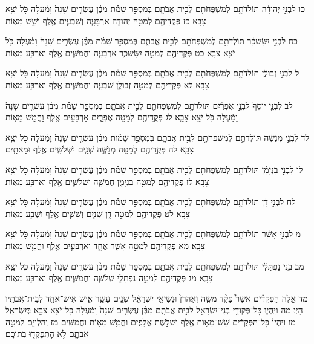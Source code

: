 \documentclass[twoside, openany, parskip=half, 11pt]{book}
\begin{document}
כו לִבְנֵ֣י יְהוּדָ֔ה תּוֹלְדֹתָ֥ם לְמִשְׁפְּחֹתָ֖ם לְבֵ֣ית אֲבֹתָ֑ם בְּמִסְפַּ֣ר שֵׁמֹ֗ת מִבֶּ֨ן עֶשְׂרִ֤ים שָׁנָה֙ וָמַ֔עְלָה כֹּ֖ל יֹצֵ֥א צָבָֽא׃ כז פְּקֻדֵיהֶ֖ם לְמַטֵּ֣ה יְהוּדָ֑ה אַרְבָּעָ֧ה וְשִׁבְעִ֛ים אֶ֖לֶף וְשֵׁ֥שׁ מֵאֽוֹת׃

כח לִבְנֵ֣י יִשָּׂשכָ֔ר תּוֹלְדֹתָ֥ם לְמִשְׁפְּחֹתָ֖ם לְבֵ֣ית אֲבֹתָ֑ם בְּמִסְפַּ֣ר שֵׁמֹ֗ת מִבֶּ֨ן עֶשְׂרִ֤ים שָׁנָה֙ וָמַ֔עְלָה כֹּ֖ל יֹצֵ֥א צָבָֽא׃ כט פְּקֻדֵיהֶ֖ם לְמַטֵּ֣ה יִשָּׂשכָ֑ר אַרְבָּעָ֧ה וַחֲמִשִּׁ֛ים אֶ֖לֶף וְאַרְבַּ֥ע מֵאֽוֹת׃

ל לִבְנֵ֣י זְבוּלֻ֔ן תּוֹלְדֹתָ֥ם לְמִשְׁפְּחֹתָ֖ם לְבֵ֣ית אֲבֹתָ֑ם בְּמִסְפַּ֣ר שֵׁמֹ֗ת מִבֶּ֨ן עֶשְׂרִ֤ים שָׁנָה֙ וָמַ֔עְלָה כֹּ֖ל יֹצֵ֥א צָבָֽא׃ לא פְּקֻדֵיהֶ֖ם לְמַטֵּ֣ה זְבוּלֻ֑ן שִׁבְעָ֧ה וַחֲמִשִּׁ֛ים אֶ֖לֶף וְאַרְבַּ֥ע מֵאֽוֹת׃

לב לִבְנֵ֤י יוֹסֵף֙ לִבְנֵ֣י אֶפְרַ֔יִם תּוֹלְדֹתָ֥ם לְמִשְׁפְּחֹתָ֖ם לְבֵ֣ית אֲבֹתָ֑ם בְּמִסְפַּ֣ר שֵׁמֹ֗ת מִבֶּ֨ן עֶשְׂרִ֤ים שָׁנָה֙ וָמַ֔עְלָה כֹּ֖ל יֹצֵ֥א צָבָֽא׃ לג פְּקֻדֵיהֶ֖ם לְמַטֵּ֣ה אֶפְרָ֑יִם אַרְבָּעִ֥ים אֶ֖לֶף וַחֲמֵ֥שׁ מֵאֽוֹת׃

לד לִבְנֵ֣י מְנַשֶּׁ֔ה תּוֹלְדֹתָ֥ם לְמִשְׁפְּחֹתָ֖ם לְבֵ֣ית אֲבֹתָ֑ם בְּמִסְפַּ֣ר שֵׁמ֗וֹת מִבֶּ֨ן עֶשְׂרִ֤ים שָׁנָה֙ וָמַ֔עְלָה כֹּ֖ל יֹצֵ֥א צָבָֽא׃ לה פְּקֻדֵיהֶ֖ם לְמַטֵּ֣ה מְנַשֶּׁ֑ה שְׁנַ֧יִם וּשְׁלֹשִׁ֛ים אֶ֖לֶף וּמָאתָֽיִם׃

לו לִבְנֵ֣י בִנְיָמִ֔ן תּוֹלְדֹתָ֥ם לְמִשְׁפְּחֹתָ֖ם לְבֵ֣ית אֲבֹתָ֑ם בְּמִסְפַּ֣ר שֵׁמֹ֗ת מִבֶּ֨ן עֶשְׂרִ֤ים שָׁנָה֙ וָמַ֔עְלָה כֹּ֖ל יֹצֵ֥א צָבָֽא׃ לז פְּקֻדֵיהֶ֖ם לְמַטֵּ֣ה בִנְיָמִ֑ן חֲמִשָּׁ֧ה וּשְׁלֹשִׁ֛ים אֶ֖לֶף וְאַרְבַּ֥ע מֵאֽוֹת׃

לח לִבְנֵ֣י דָ֔ן תּוֹלְדֹתָ֥ם לְמִשְׁפְּחֹתָ֖ם לְבֵ֣ית אֲבֹתָ֑ם בְּמִסְפַּ֣ר שֵׁמֹ֗ת מִבֶּ֨ן עֶשְׂרִ֤ים שָׁנָה֙ וָמַ֔עְלָה כֹּ֖ל יֹצֵ֥א צָבָֽא׃ לט פְּקֻדֵיהֶ֖ם לְמַטֵּ֣ה דָ֑ן שְׁנַ֧יִם וְשִׁשִּׁ֛ים אֶ֖לֶף וּשְׁבַ֥ע מֵאֽוֹת׃

מ לִבְנֵ֣י אָשֵׁ֔ר תּוֹלְדֹתָ֥ם לְמִשְׁפְּחֹתָ֖ם לְבֵ֣ית אֲבֹתָ֑ם בְּמִסְפַּ֣ר שֵׁמֹ֗ת מִבֶּ֨ן עֶשְׂרִ֤ים שָׁנָה֙ וָמַ֔עְלָה כֹּ֖ל יֹצֵ֥א צָבָֽא׃ מא פְּקֻדֵיהֶ֖ם לְמַטֵּ֣ה אָשֵׁ֑ר אֶחָ֧ד וְאַרְבָּעִ֛ים אֶ֖לֶף וַחֲמֵ֥שׁ מֵאֽוֹת׃

מב בְּנֵ֣י נַפְתָּלִ֔י תּוֹלְדֹתָ֥ם לְמִשְׁפְּחֹתָ֖ם לְבֵ֣ית אֲבֹתָ֑ם בְּמִסְפַּ֣ר שֵׁמֹ֗ת מִבֶּ֨ן עֶשְׂרִ֤ים שָׁנָה֙ וָמַ֔עְלָה כֹּ֖ל יֹצֵ֥א צָבָֽא׃ מג פְּקֻדֵיהֶ֖ם לְמַטֵּ֣ה נַפְתָּלִ֑י שְׁלֹשָׁ֧ה וַחֲמִשִּׁ֛ים אֶ֖לֶף וְאַרְבַּ֥ע מֵאֽוֹת׃

מד אֵ֣לֶּה הַפְּקֻדִ֡ים אֲשֶׁר֩ פָּקַ֨ד מֹשֶׁ֤ה וְאַהֲרֹן֙ וּנְשִׂיאֵ֣י יִשְׂרָאֵ֔ל שְׁנֵ֥ים עָשָׂ֖ר אִ֑ישׁ אִישׁ־אֶחָ֥ד לְבֵית־אֲבֹתָ֖יו הָיֽוּ׃ מה וַיִּֽהְי֛וּ כׇּל־פְּקוּדֵ֥י בְנֵֽי־יִשְׂרָאֵ֖ל לְבֵ֣ית אֲבֹתָ֑ם מִבֶּ֨ן עֶשְׂרִ֤ים שָׁנָה֙ וָמַ֔עְלָה כׇּל־יֹצֵ֥א צָבָ֖א בְּיִשְׂרָאֵֽל׃ מו וַיִּֽהְיוּ֙ כׇּל־הַפְּקֻדִ֔ים שֵׁשׁ־מֵא֥וֹת אֶ֖לֶף וּשְׁלֹ֣שֶׁת אֲלָפִ֑ים וַחֲמֵ֥שׁ מֵא֖וֹת וַחֲמִשִּֽׁים׃ מז וְהַלְוִיִּ֖ם לְמַטֵּ֣ה אֲבֹתָ֑ם לֹ֥א הׇתְפָּקְד֖וּ בְּתוֹכָֽם׃
\end{document}
